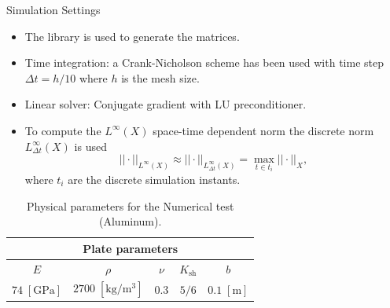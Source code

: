 \documentclass[aspectratio=169]{ISAE-Beamer}
\begin{document}
\begin{frame}{Simulation Settings}
\begin{itemize}
	\item The {} library is used to generate the matrices. 
	\item Time integration: a Crank-Nicholson scheme has been used with time step $\Delta t = h/10$ where $h$ is the mesh size.
	\item Linear solver: Conjugate gradient with LU preconditioner.
	\item To compute the $L^\infty ({X})$ space-time dependent norm  the discrete norm $L^\infty_{\Delta t} ({X})$ is used
	\[
	||\cdot ||_{L^\infty ({X})} \approx || \cdot ||_{L^\infty_{\Delta t} ({X})} = \max_{t \in t_i} ||\cdot||_{{X}},
	\]
	where $t_i$ are the discrete simulation instants.
\end{itemize}

 \begin{table}[htbp]
 	\centering
 	\begin{tabular}{ccccc}
 		\hline 
 		\multicolumn{5}{c}{Plate parameters} \\ 
 		\hline 
 		$E$ & $\rho$ & $\nu$ & $K_{\text{sh}}$ & $b$ \\
 		$74 \;  [\textrm{GPa}]$ & $2700\; [\textrm{kg}/\textrm{m}^3]$ & $0.3$ & $5/6$ &  $0.1 \;  [\textrm{m}]$\\ 
 		\hline 
 	\end{tabular} 
 	\caption{Physical parameters for the Numerical test (Aluminum).}
 \end{table}
\end{frame}
\end{document}
